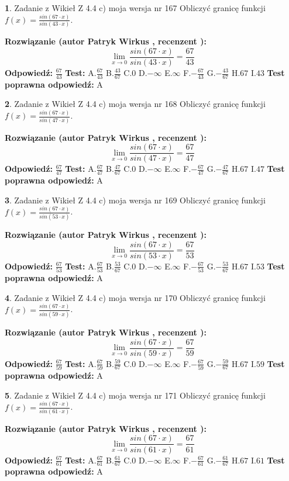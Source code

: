 \documentclass[12pt, a4paper]{article}
\theoremstyle{definition} %
\newtheorem{zad}{}
\newcommand{\zadStart}[1]{\begin{zad}#1\newline}
\newcommand{\zadStop}{\end{zad}}
\newcommand{\rozwStart}[2]{\noindent \textbf{Rozwiązanie (autor #1 , recenzent #2): }\newline}
\newcommand{\rozwStop}{\newline}
\newcommand{\odpStart}{\noindent \textbf{Odpowiedź:}\newline}
\newcommand{\odpStop}{\newline}
\newcommand{\testStart}{\noindent \textbf{Test:}\newline}
\newcommand{\testStop}{\newline}
\newcommand{\kluczStart}{\noindent \textbf{Test poprawna odpowiedź:}\newline}
\newcommand{\kluczStop}{\newline}
\begin{document}
\zadStart{Zadanie z Wikieł Z 4.4 c) moja wersja nr 167}
Obliczyć granicę funkcji $f(x)=\frac{sin(67\cdot x)}{sin(43\cdot x)}$.
\zadStop
\rozwStart{Patryk Wirkus}{}
$$\lim\limits_{x\to 0}\frac{sin(67\cdot x)}{sin(43\cdot x)}=
\frac{67}{43}$$
\rozwStop
\odpStart
$\frac{67}{43}$
\odpStop
\testStart
A.$\frac{67}{43}$
B.$\frac{43}{67}$
C.$0$
D.$-\infty$
E.$\infty$
F.$-\frac{67}{43}$
G.$-\frac{43}{67}$
H.$67$
I.$43$
\testStop
\kluczStart
A
\kluczStop



\zadStart{Zadanie z Wikieł Z 4.4 c) moja wersja nr 168}
Obliczyć granicę funkcji $f(x)=\frac{sin(67\cdot x)}{sin(47\cdot x)}$.
\zadStop
\rozwStart{Patryk Wirkus}{}
$$\lim\limits_{x\to 0}\frac{sin(67\cdot x)}{sin(47\cdot x)}=
\frac{67}{47}$$
\rozwStop
\odpStart
$\frac{67}{47}$
\odpStop
\testStart
A.$\frac{67}{47}$
B.$\frac{47}{67}$
C.$0$
D.$-\infty$
E.$\infty$
F.$-\frac{67}{47}$
G.$-\frac{47}{67}$
H.$67$
I.$47$
\testStop
\kluczStart
A
\kluczStop



\zadStart{Zadanie z Wikieł Z 4.4 c) moja wersja nr 169}
Obliczyć granicę funkcji $f(x)=\frac{sin(67\cdot x)}{sin(53\cdot x)}$.
\zadStop
\rozwStart{Patryk Wirkus}{}
$$\lim\limits_{x\to 0}\frac{sin(67\cdot x)}{sin(53\cdot x)}=
\frac{67}{53}$$
\rozwStop
\odpStart
$\frac{67}{53}$
\odpStop
\testStart
A.$\frac{67}{53}$
B.$\frac{53}{67}$
C.$0$
D.$-\infty$
E.$\infty$
F.$-\frac{67}{53}$
G.$-\frac{53}{67}$
H.$67$
I.$53$
\testStop
\kluczStart
A
\kluczStop



\zadStart{Zadanie z Wikieł Z 4.4 c) moja wersja nr 170}
Obliczyć granicę funkcji $f(x)=\frac{sin(67\cdot x)}{sin(59\cdot x)}$.
\zadStop
\rozwStart{Patryk Wirkus}{}
$$\lim\limits_{x\to 0}\frac{sin(67\cdot x)}{sin(59\cdot x)}=
\frac{67}{59}$$
\rozwStop
\odpStart
$\frac{67}{59}$
\odpStop
\testStart
A.$\frac{67}{59}$
B.$\frac{59}{67}$
C.$0$
D.$-\infty$
E.$\infty$
F.$-\frac{67}{59}$
G.$-\frac{59}{67}$
H.$67$
I.$59$
\testStop
\kluczStart
A
\kluczStop



\zadStart{Zadanie z Wikieł Z 4.4 c) moja wersja nr 171}
Obliczyć granicę funkcji $f(x)=\frac{sin(67\cdot x)}{sin(61\cdot x)}$.
\zadStop
\rozwStart{Patryk Wirkus}{}
$$\lim\limits_{x\to 0}\frac{sin(67\cdot x)}{sin(61\cdot x)}=
\frac{67}{61}$$
\rozwStop
\odpStart
$\frac{67}{61}$
\odpStop
\testStart
A.$\frac{67}{61}$
B.$\frac{61}{67}$
C.$0$
D.$-\infty$
E.$\infty$
F.$-\frac{67}{61}$
G.$-\frac{61}{67}$
H.$67$
I.$61$
\testStop
\kluczStart
A
\kluczStop
\end{document}

